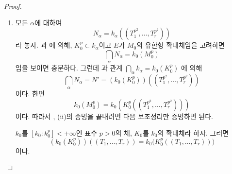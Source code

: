 \begin{proof}
\begin{enumerate}
  다시 에 의해
  \[
    d(E/L_0,M)=d(E/L_0,k_0)+d(E/L_0,M/k_0)
  \]
  이고
  \[
    d(L_0/M_0,N)=d(L_0/M_0,N/k)+d(L_0/M_0,k)
  \]
  이다. 그런데 $L_0$는 $K_0$의 분리 확대체이므로
  , $d(L_0/K_0,k)=0$이고, 따라서
  $d(L_0/M_0,k)=0$이기도 하다
  (와 ). 그러므로
  \[
    \delta=d(E/L_0,M/k_0)+d(L_0/M_0,N/k)
  \]
  이다. 이 식의 우변 첫째 항에 를 다시 두 번
  적용하면
  \[
    d(E/L_0,M/k_0)
    =d(E/L_0,M/N)+d(E/L_0,N/k)+d(E/L_0,k/k_0)
  \]
  을 얻는다. $M\subset N(L_0^p)$이므로
  $d(E/L_0,M/N)=0$이다 . 따라서
  에 의해
  \[
    \delta=d(E/L_0,k/k_0)+d(E/M_0,N/k)
  \]
  이다. 그런데 $M_0$와 $L_0$는 $K_0$의 분리 확대체이므로
  ,
  \[
    d(L_0/K_0,k/k_0)=d(M_0/K_0,k/k_0)=0
  \]
  이다 . 다시 를 두 번 적용하면

  \[
    d(E/L_0,k/k_0)=d(E/K_0,k/k_0)=d(E/M_0,k/k_0)
  \]
  이고, 마지막으로 를 적용하면
  \[
    \delta=d(E/M_0,N/k_0)
  \]
  이다. 이로써 이 증명된다. 더욱이
  $k_0\subset k'\subset k$인 중간체 $k'$로 $k$를 바꾸면 $N$은 어떤
  부분확대체 $N'$으로 바뀐다. 따라서 에 의해
  \[
    d(E/M_0,N'/k_0)\leqslant d(E/M_0,N/k_0)
  \]
  이고, 이것이 (i)의 마지막 주장을 증명한다.

  \item[(ii)] 모든 $\alpha$에 대하여
  \[
    N_\alpha=k_\alpha((T_1^{p^2},\ldots,T_r^{p^2}))
  \]
  라 놓자. 과 에 의해,
  $K_0^p\subset k_\alpha$이고 $E$가 $M_0$의 유한형 확대체임을
  고려하면
  \[
    \bigcap_\alpha N_\alpha=k_0(M_0^p)
  \]
  임을 보이면 충분하다. 그런데 과 관계
  $\bigcap_\alpha k_\alpha=k_0(K_0^p)$
  에 의해
  \begin{equation}
  \tag{21.9.6.6}
  \label{0.21.9.6.6-ko}
    \bigcap_\alpha N_\alpha=N'
    =(k_0(K_0^p))((T_1^{p^2},\ldots,T_r^{p^2}))
  \end{equation}
  이다. 한편
  \[
    k_0(M_0^p)=k_0(K_0^p((T_1^{p^2},\ldots,T_r^{p^2})))
  \]
  이다. 따라서 , (ii)의 증명을 끝내려면 다음
  보조정리만 증명하면 된다.

  \begin{lemma}[21.9.6.7]
  \label{0.21.9.6.7-ko}
  $k_0$를 $[k_0:k_0^p]<+\infty$인 표수 $p>0$의 체, $K_0$를
  $k_0$의 확대체라 하자. 그러면
  \begin{equation}
  \tag{21.9.6.8}
  \label{0.21.9.6.8-ko}
    (k_0(K_0^p))((T_1,\ldots,T_r))
    =k_0\bigl(K_0^p((T_1,\ldots,T_r))\bigr)
  \end{equation}
  이다.
  \end{lemma}


\end{enumerate}
\end{proof}
